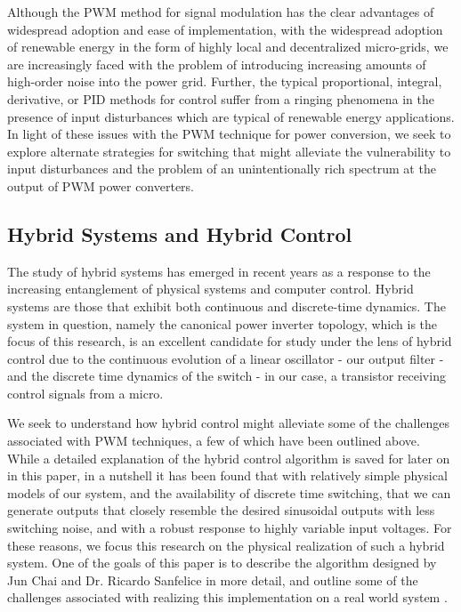 Although the PWM method for signal modulation has the clear advantages of widespread adoption and ease of implementation, with the widespread adoption of renewable energy in the form of highly local and decentralized micro-grids, we are increasingly faced with the problem of introducing increasing amounts of high-order noise into the power grid. Further, the typical proportional, integral, derivative, or PID methods for control suffer from a ringing phenomena in the presence of input disturbances which are typical of renewable energy applications. In light of these issues with the PWM technique for power conversion, we seek to explore alternate strategies for switching that might alleviate the vulnerability to  input disturbances and the problem of an unintentionally rich spectrum at the output of PWM power converters. 

\subsection{Hybrid Systems and Hybrid Control}
\label{hybridApproach}
The study of hybrid systems has emerged in recent years as a response to the increasing entanglement of physical systems and computer control. 
Hybrid systems are those that exhibit both continuous and discrete-time dynamics. The system in question, namely the canonical power inverter topology, which is the focus of this research, is an excellent candidate for study under the lens of hybrid control due to the continuous evolution of a linear oscillator - our output filter - and the discrete time dynamics of the switch - in our case, a transistor receiving control signals from a micro. 

We seek to understand how hybrid control might alleviate some of the challenges associated with PWM techniques, a few of which have been outlined above. While a detailed explanation of the hybrid control algorithm is saved for later on in this paper, in a nutshell it has been found that with relatively simple physical models of our system, and the availability of discrete time switching, that we can generate outputs that closely resemble the desired sinusoidal outputs with less switching noise, and with a robust response to highly variable input voltages. For these reasons, we focus this research on the physical realization of such a hybrid system. One of the goals of this paper is to describe the algorithm designed by Jun Chai and Dr. Ricardo Sanfelice in more detail, and outline some of the challenges associated with realizing this implementation on a real world system \cite{ricardo}.

